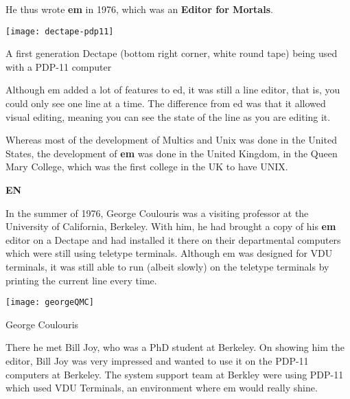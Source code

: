 He thus wrote \textbf{em} in 1976, which was an \textbf{Editor for Mortals}.


\begin{marginfigure}
  \texttt{[image: dectape-pdp11]}
  \caption{A first generation Dectape
  (bottom right corner, white round tape)
  being used with a PDP-11 computer}
\end{marginfigure}

Although em added a lot of features to ed, it was still
a line editor, that is, you could only see one line at a time.
The difference from ed was that it allowed visual editing,
meaning you can see the state of the line as you are editing it.

Whereas most of the development of Multics and Unix
was done in the United States, the development of \textbf{em}
was done in the United Kingdom, in the Queen Mary College,
which was the first college in the UK to have UNIX.

\textbf{EN}

In the summer of 1976, George Coulouris was a visiting professor
at the University of California, Berkeley.
With him, he had brought a copy of his \textbf{em} editor
on a Dectape
and had installed it there on their departmental computers
which were still using teletype terminals.
Although em was designed for VDU terminals, it was still
able to run (albeit slowly) on the teletype terminals
by printing the current line every time.

\begin{marginfigure}
  \texttt{[image: georgeQMC]}
  \caption{George Coulouris}
\end{marginfigure}

There he met Bill Joy, who was a PhD student at Berkeley.
On showing him the editor, Bill Joy was very impressed
and wanted to use it on the PDP-11 computers at Berkeley.
The system support team at Berkley were using PDP-11 which
used VDU Terminals, an environment where em would really shine.

